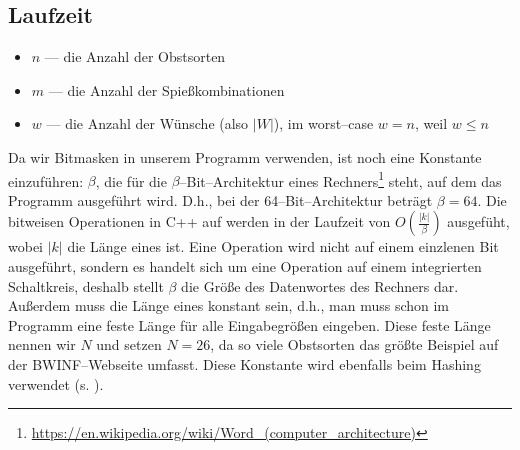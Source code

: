 \subsection{Laufzeit}\label{sec:laufzeit}
\begin{itemize}
  \item $n$ --- die Anzahl der Obstsorten
  \item $m$ --- die Anzahl der Spießkombinationen
  \item $w$ --- die Anzahl der Wünsche (also $|W|$), im worst--case $w = n$, weil $w \leqslant n$
\end{itemize}

Da wir Bitmasken in unserem Programm verwenden, ist noch eine Konstante einzuführen: $\beta$,
die für die $\beta$--Bit--Architektur eines Rechners\footnote{\href{https://en.wikipedia.org/wiki/Word_(computer_architecture)}{https://en.wikipedia.org/wiki/Word\_(computer\_architecture)}}
steht, auf dem das Programm ausgeführt wird. D.h., bei der 64--Bit--Architektur beträgt $\beta = 64$.
Die bitweisen Operationen in C++ auf  werden in der Laufzeit von $O(\frac{|k|}{\beta})$
ausgefüht, wobei $|k|$ die Länge eines  ist. Eine Operation wird nicht auf einem einzlenen Bit ausgeführt, sondern es handelt sich um eine Operation auf einem integrierten Schaltkreis, deshalb
stellt $\beta$ die Größe des Datenwortes des Rechners dar.
Außerdem muss die Länge eines 
konstant sein, d.h., man muss schon im Programm eine feste Länge für alle Eingabegrößen eingeben.
Diese feste Länge nennen wir $N$ und setzen $N =26$, da so viele Obstsorten das größte Beispiel
auf der BWINF--Webseite umfasst. Diese Konstante wird ebenfalls beim Hashing verwendet (s. ).

